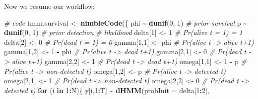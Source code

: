 \documentclass[
  12pt,
]{krantz}
\newenvironment{Shaded}{\begin{snugshade}}{\end{snugshade}}
\newcommand{\AttributeTok}[1]{\textcolor[rgb]{0.13,0.29,0.53}{#1}}
\newcommand{\CommentTok}[1]{\textcolor[rgb]{0.56,0.35,0.01}{\textit{#1}}}
\newcommand{\ControlFlowTok}[1]{\textcolor[rgb]{0.13,0.29,0.53}{\textbf{#1}}}
\newcommand{\DecValTok}[1]{\textcolor[rgb]{0.00,0.00,0.81}{#1}}
\newcommand{\FunctionTok}[1]{\textcolor[rgb]{0.13,0.29,0.53}{\textbf{#1}}}
\newcommand{\NormalTok}[1]{#1}
\newcommand{\OtherTok}[1]{\textcolor[rgb]{0.56,0.35,0.01}{#1}}
\newcommand{\SpecialCharTok}[1]{\textcolor[rgb]{0.81,0.36,0.00}{\textbf{#1}}}
\begin{document}
Now we resume our workflow:

\begin{Shaded}
\begin{Highlighting}[]
\CommentTok{\# code}
\NormalTok{hmm.survival }\OtherTok{\textless{}{-}} \FunctionTok{nimbleCode}\NormalTok{(\{}
\NormalTok{  phi }\SpecialCharTok{\textasciitilde{}} \FunctionTok{dunif}\NormalTok{(}\DecValTok{0}\NormalTok{, }\DecValTok{1}\NormalTok{) }\CommentTok{\# prior survival}
\NormalTok{  p }\SpecialCharTok{\textasciitilde{}} \FunctionTok{dunif}\NormalTok{(}\DecValTok{0}\NormalTok{, }\DecValTok{1}\NormalTok{) }\CommentTok{\# prior detection}
  \CommentTok{\# likelihood}
\NormalTok{  delta[}\DecValTok{1}\NormalTok{] }\OtherTok{\textless{}{-}} \DecValTok{1}          \CommentTok{\# Pr(alive t = 1) = 1}
\NormalTok{  delta[}\DecValTok{2}\NormalTok{] }\OtherTok{\textless{}{-}} \DecValTok{0}          \CommentTok{\# Pr(dead t = 1) = 0}
\NormalTok{  gamma[}\DecValTok{1}\NormalTok{,}\DecValTok{1}\NormalTok{] }\OtherTok{\textless{}{-}}\NormalTok{ phi      }\CommentTok{\# Pr(alive t {-}\textgreater{} alive t+1)}
\NormalTok{  gamma[}\DecValTok{1}\NormalTok{,}\DecValTok{2}\NormalTok{] }\OtherTok{\textless{}{-}} \DecValTok{1} \SpecialCharTok{{-}}\NormalTok{ phi  }\CommentTok{\# Pr(alive t {-}\textgreater{} dead t+1)}
\NormalTok{  gamma[}\DecValTok{2}\NormalTok{,}\DecValTok{1}\NormalTok{] }\OtherTok{\textless{}{-}} \DecValTok{0}        \CommentTok{\# Pr(dead t {-}\textgreater{} alive t+1)}
\NormalTok{  gamma[}\DecValTok{2}\NormalTok{,}\DecValTok{2}\NormalTok{] }\OtherTok{\textless{}{-}} \DecValTok{1}        \CommentTok{\# Pr(dead t {-}\textgreater{} dead t+1)}
\NormalTok{  omega[}\DecValTok{1}\NormalTok{,}\DecValTok{1}\NormalTok{] }\OtherTok{\textless{}{-}} \DecValTok{1} \SpecialCharTok{{-}}\NormalTok{ p    }\CommentTok{\# Pr(alive t {-}\textgreater{} non{-}detected t)}
\NormalTok{  omega[}\DecValTok{1}\NormalTok{,}\DecValTok{2}\NormalTok{] }\OtherTok{\textless{}{-}}\NormalTok{ p        }\CommentTok{\# Pr(alive t {-}\textgreater{} detected t)}
\NormalTok{  omega[}\DecValTok{2}\NormalTok{,}\DecValTok{1}\NormalTok{] }\OtherTok{\textless{}{-}} \DecValTok{1}        \CommentTok{\# Pr(dead t {-}\textgreater{} non{-}detected t)}
\NormalTok{  omega[}\DecValTok{2}\NormalTok{,}\DecValTok{2}\NormalTok{] }\OtherTok{\textless{}{-}} \DecValTok{0}        \CommentTok{\# Pr(dead t {-}\textgreater{} detected t)}
  \ControlFlowTok{for}\NormalTok{ (i }\ControlFlowTok{in} \DecValTok{1}\SpecialCharTok{:}\NormalTok{N)\{}
\NormalTok{    y[i,}\DecValTok{1}\SpecialCharTok{:}\NormalTok{T] }\SpecialCharTok{\textasciitilde{}} \FunctionTok{dHMM}\NormalTok{(}\AttributeTok{probInit =}\NormalTok{ delta[}\DecValTok{1}\SpecialCharTok{:}\DecValTok{2}\NormalTok{], }

\end{Highlighting}
\end{Shaded}
\end{document}
